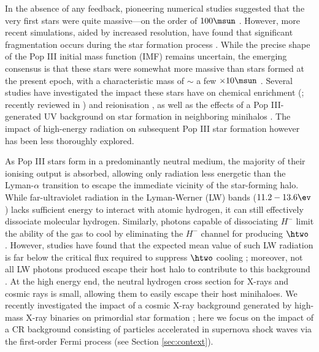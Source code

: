 In the absence of any feedback, pioneering numerical studies suggested that the very first stars were quite massive---on the order of $100\msun$ \citep[e.g.,][]{BrommCoppiLarson1999,BrommCoppiLarson2002,AbelBryanNorman2002,Yoshidaetal2003,BrommLarson2004,Yoshidaetal2006,OSheaNorman2007}. 
However, more recent simulations, aided by increased resolution, have found that significant fragmentation occurs during the star formation process \citep{TurkAbelOShea2009,StacyGreifBromm2010,Clarketal2011a,Clarketal2011b,Greifetal2011,Greifetal2012,StacyBromm2013,Hiranoetal2014,Hosokawaetal2015}.
While the precise shape of the Pop III initial mass function (IMF) remains uncertain, the emerging consensus is that these stars were somewhat more massive than stars formed at the present epoch, with a characteristic mass of $\sim$ a few $\times 10\msun$ \citep{Bromm2013}. 
Several studies have investigated the impact these stars have on chemical enrichment (\citealt{MadauFerraraRees2001,MoriFerraraMadau2002,BrommYoshidaHernquist2003,MackeyBrommHernquist2003,Hegeretal2003,UmedaNomoto2003,BrommLarson2004,KitayamaYoshida2005,TornatoreFerraraSchneider2007,Greifetal2007,Greifetal2010,WiseAbel2008,Maioetal2011}; recently reviewed in \citealt{Whalenetal2008,Joggerstetal2010,KarlssonBrommHawthorn2013}) and  reionisation \citep{Kitayamaetal2004,Sokasianetal2004,WhalenAbelNorman2004,AlvarezBrommShapiro2006,JohnsonGreifBromm2007,Robertsonetal2010}, as well as the effects of a Pop III-generated UV background on star formation in neighboring minihalos \citep{ShapiroIlievRaga2004,IlievShapiroRaga2005,OSheaetal2005,SusaUmemura2006,Susa2007,Whalenetal2008a,HasegawaUmemura2009,WhalenHueckstaedtMcConkie2010}.
The impact of high-energy radiation on subsequent Pop III star formation however has been less thoroughly explored.

As Pop III stars form in a predominantly neutral medium, the majority of their ionising output is absorbed, allowing only radiation less energetic than the Lyman-$\alpha$ transition to escape the immediate vicinity of the star-forming halo.  
While far-ultraviolet radiation in the Lyman-Werner (LW) bands ($11.2 - 13.6\ev$) lacks sufficient energy to interact with atomic hydrogen, it can still effectively dissociate molecular hydrogen.
Similarly, photons capable of dissociating $H^-$ limit the ability of the gas to cool by eliminating the $H^-$ channel for producing $\htwo$ \citep{Agarwaletal2012,Agarwaletal2016}.
However, studies have found that the expected mean value of such LW radiation is far below the critical flux required to suppress $\htwo$ cooling \mbox{\citep{Dijkstraetal2008}}; moreover, not all LW photons produced escape their host halo to contribute to this background \citep{Schaueretal2015}.
At the high energy end, the neutral hydrogen cross section for X-rays and cosmic rays is small, allowing them to easily escape their host minihaloes. 
We recently investigated the impact of a cosmic X-ray background generated by high-mass X-ray binaries on primordial star formation \citep{Hummeletal2015}; here we focus on the impact of a CR background consisting of particles accelerated in supernova shock waves via the first-order Fermi process (see Section \ref{sec:context}).  

